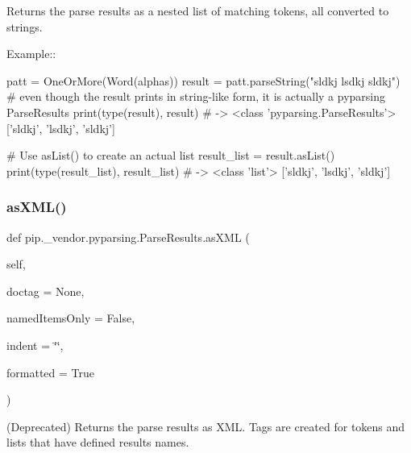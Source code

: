 \begin{DoxyVerb}Returns the parse results as a nested list of matching tokens, all converted to strings.

Example::

    patt = OneOrMore(Word(alphas))
    result = patt.parseString("sldkj lsdkj sldkj")
    # even though the result prints in string-like form, it is actually a pyparsing ParseResults
    print(type(result), result) # -> <class 'pyparsing.ParseResults'> ['sldkj', 'lsdkj', 'sldkj']

    # Use asList() to create an actual list
    result_list = result.asList()
    print(type(result_list), result_list) # -> <class 'list'> ['sldkj', 'lsdkj', 'sldkj']
\end{DoxyVerb}
 \mbox{\label{classpip_1_1__vendor_1_1pyparsing_1_1ParseResults_a5898c1783e968686d2e55c0e72a6031b}} 
\subsubsection{\texorpdfstring{as\+X\+M\+L()}{asXML()}}
{\footnotesize\ttfamily def pip.\+\_\+vendor.\+pyparsing.\+Parse\+Results.\+as\+X\+ML (\begin{DoxyParamCaption}\item[{}]{self,  }\item[{}]{doctag = {\ttfamily None},  }\item[{}]{named\+Items\+Only = {\ttfamily False},  }\item[{}]{indent = {\ttfamily \char`\"{}\char`\"{}},  }\item[{}]{formatted = {\ttfamily True} }\end{DoxyParamCaption})}

\begin{DoxyVerb}(Deprecated) Returns the parse results as XML. Tags are created for tokens and lists that have defined results names.
\end{DoxyVerb}
 \mbox{\label{classpip_1_1__vendor_1_1pyparsing_1_1ParseResults_ab6e049e34b90004c1d59069da7a5cc08}} 
